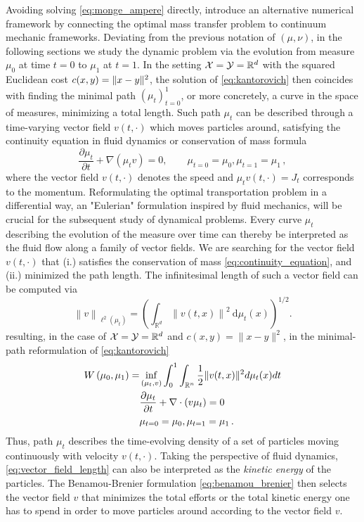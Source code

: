 Avoiding solving \eqref{eq:monge_ampere} directly, \citet{benamou2000computational} introduce an alternative numerical framework by connecting the optimal mass transfer problem to continuum mechanic frameworks.
Deviating from the previous notation of $(\mu, \nu)$, in the following sections we study the dynamic problem via the evolution from measure $\mu_0$ at time $t=0$ to $\mu_1$ at $t=1$. 
In the setting ${\mathcal{X}} = {\mathcal{Y}} = \mathbb{R}^d$ with the squared Euclidean cost $c(x, y) = \lVert x-y\rVert^2$, the solution of \eqref{eq:kantorovich} then coincides with finding the minimal path $(\mu_t)_{t=0}^1$, or more concretely, a curve in the space of measures, minimizing a total length.  
Such path $\mu_t$ can be described through a time-varying vector field $v(t, \cdot)$ which moves particles around, satisfying the continuity equation in fluid dynamics or conservation of mass formula
\begin{equation} \label{eq:continuity_equation}
	\frac{\partial \mu_t}{\partial t}+\nabla\left(\mu_t v\right)= 0, \qquad \mu_{t=0}=\mu_0, \mu_{t=1}=\mu_1\,,
\end{equation}
where the vector field $v(t, \cdot)$ denotes the speed and $\mu_t v(t, \cdot) = J_t$ corresponds to the momentum.
Reformulating the optimal transportation problem in a differential way, an "Eulerian" formulation inspired by fluid mechanics, will be crucial for the subsequent study of dynamical problems.
Every curve $\mu_t$ describing the evolution of the measure over time can thereby be interpreted as the fluid flow along a family of vector fields. We are searching for the vector field $v(t, \cdot)$ that (i.) satisfies the conservation of mass \eqref{eq:continuity_equation}, and (ii.) minimized the path length.
The infinitesimal length of such a vector field can be computed via 
\begin{equation} \label{eq:vector_field_length}
	\left\|v\right\|_{\ell^2\left(\mu_t\right)}=\left(\int_{\mathbb{R}^d}\left\|v(t, x)\right\|^2 \mathrm{~d} \mu_t(x)\right)^{1 / 2}.
\end{equation}
resulting, in the case of ${\mathcal{X}} = {\mathcal{Y}} = \mathbb{R}^d$ and $c(x, y)=\|x-y\|^2$, in the minimal-path reformulation of \eqref{eq:kantorovich}
\begin{align}  \label{eq:benamou_brenier}
	W\left(\mu_0, \mu_1\right)=& \inf _{(\mu_t, v)} \int_0^1 \int_{\mathbb{R}^n}\frac{1}{2}\lVert v(t, x)\rVert^2 d\mu_t(x) d t \\
	& \nonumber \frac{\partial \mu_t}{\partial t}+\nabla \cdot(v \mu_t)=0 \\
	& \nonumber \mu_{t=0}=\mu_0, \mu_{t=1}=\mu_1\, .
\end{align}
Thus, path $\mu_t$ describes the time-evolving density of a set of particles moving continuously with velocity $v(t, \cdot)$.
Taking the perspective of fluid dynamics, \eqref{eq:vector_field_length} can also be interpreted as the \emph{kinetic energy} of the particles.
The Benamou-Brenier formulation \eqref{eq:benamou_brenier} then selects the vector field $v$ that minimizes the total efforts or the total kinetic energy one has to spend in order to move particles around according to the vector field $v$. \\


